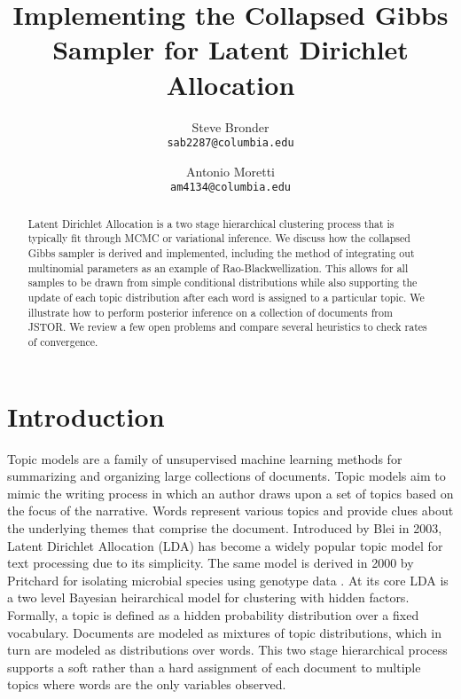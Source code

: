 \documentclass{article}%
\title{Implementing the Collapsed Gibbs Sampler for Latent Dirichlet Allocation}
\author{
  Steve Bronder \\
  \texttt{sab2287@columbia.edu} \\
   \and
   Antonio Moretti \\
   \texttt{am4134@columbia.edu} \\
}
\theoremstyle{definition}
\begin{document}

\maketitle

\begin{abstract}
  Latent Dirichlet Allocation is a two stage hierarchical clustering process that is typically fit through MCMC or variational inference. We discuss how the collapsed Gibbs sampler is derived and implemented, including the method of integrating out multinomial parameters as an example of Rao-Blackwellization. This allows for all samples to be drawn from simple conditional distributions while also supporting the update of each topic distribution after each word is assigned to a particular topic. We illustrate how to perform posterior inference on a collection of documents from JSTOR. We review a few open problems and compare several heuristics to check rates of convergence.  %
  \end{abstract}

\section{Introduction}
Topic models are a family of unsupervised machine learning methods for summarizing and organizing large collections of documents. Topic models aim to mimic the writing process in which an author draws upon a set of topics based on the focus of the narrative. Words represent various topics and provide clues about the underlying themes that comprise the document. Introduced by Blei in 2003,  Latent Dirichlet Allocation \cite{Blei:2003:LDA:944919.944937} (LDA) has become a widely popular topic model for text processing due to its simplicity. The same model is derived in 2000 by Pritchard for isolating microbial species using genotype data \cite{Pritchardetal2000}. At its core LDA is a two level Bayesian heirarchical model for clustering with hidden factors. Formally, a topic is defined as a hidden probability distribution over a fixed vocabulary. Documents are modeled as mixtures of topic distributions, which in turn are modeled as distributions over words. This two stage hierarchical process supports a soft rather than a hard assignment of each document to multiple topics where words are the only variables observed. \nocite{10.2307/2685208,citeulike:6744178} 
\end{document}
